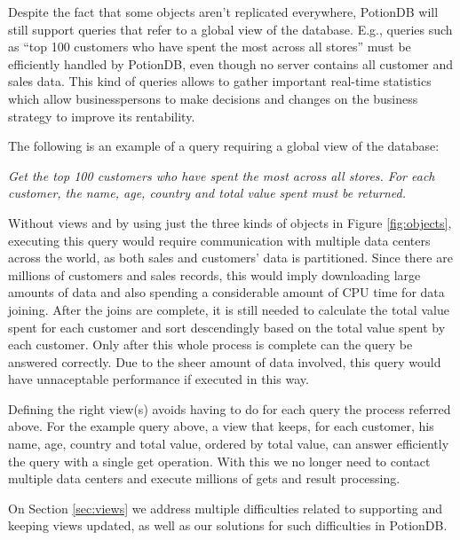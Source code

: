 \documentclass{vldb}
\newcommand{\emphvspace}{0.5\baselineskip}
\newcommand{\lineemph}[1]{\vspace{\emphvspace}\hspace{2em}\emph{#1}\vspace{\emphvspace}}
\newcommand{\andre}[1]{\nbnote{Andre}{blue}{#1}}
\begin{document}
Despite the fact that some objects aren't replicated everywhere, PotionDB will still support queries that refer to a global view of the database.
E.g., queries such as ``top 100 customers who have spent the most across all stores'' must be efficiently handled by PotionDB, even though no server contains all customer and sales data. 
This kind of queries allows to gather important real-time statistics which allow businesspersons to make decisions and changes on the business strategy to improve its rentability.
\andre{Should I refer tpc-h here?}

The following is an example of a query requiring a global view of the database:

\lineemph{Get the top 100 customers who have spent the most across all stores. For each customer, the name, age, country and total value spent must be returned.}

Without views and by using just the three kinds of objects in Figure \ref{fig:objects}, executing this query would require communication with multiple data centers across the world, as both sales and customers' data is partitioned.
Since there are millions of customers and sales records, this would imply downloading large amounts of data and also spending a considerable amount of CPU time for data joining.
After the joins are complete, it is still needed to calculate the total value spent for each customer and sort descendingly based on the total value spent by each customer.
Only after this whole process is complete can the query be answered correctly.
Due to the sheer amount of data involved, this query would have unnaceptable performance if executed in this way.

Defining the right view(s) avoids having to do for each query the process referred above.
For the example query above, a view that keeps, for each customer, his name, age, country and total value, ordered by total value, can answer efficiently the query with a single get operation.
With this we no longer need to contact multiple data centers and execute millions of gets and result processing.

On Section \ref{sec:views} we address multiple difficulties related to supporting and keeping views updated, as well as our solutions for such difficulties in PotionDB.

\fi
\fi
\end{document}
